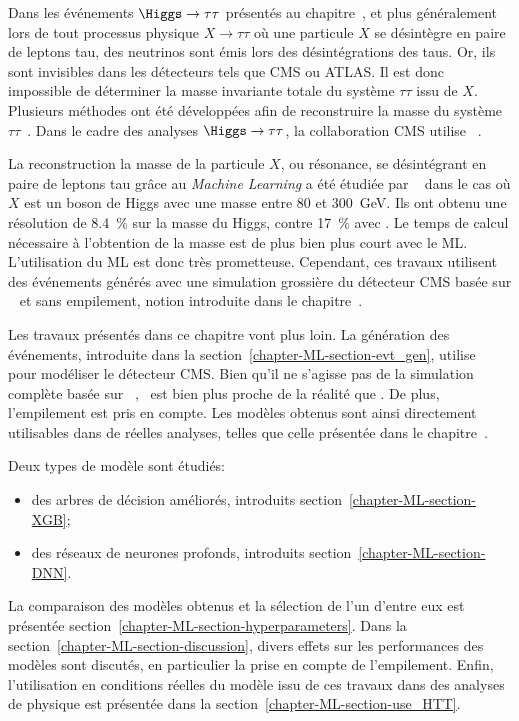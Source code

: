 \par
Dans les événements $\Higgs\to\tau\tau$ présentés au chapitre~,
et plus généralement lors de tout processus physique $X\to\tau\tau$ où une particule $X$ se désintègre en paire de leptons tau,
des neutrinos sont émis lors des désintégrations des taus.
Or, ils sont invisibles dans les détecteurs tels que CMS ou ATLAS.
Il est donc impossible de déterminer la masse invariante totale du système $\tau\tau$ issu de $X$.
Plusieurs méthodes ont été développées afin de reconstruire la masse du système $\tau\tau$~\cite{ELAGIN2011481,Barr_2011,Gripaios_2013}.
Dans le cadre des analyses $\Higgs\to\tau\tau$, la collaboration CMS utilise \SVFIT~\cite{SVFit_Bianchini_2014}.
\par
La reconstruction la masse de la particule $X$, ou résonance, se désintégrant en paire de leptons tau grâce au \emph{Machine Learning}
a été étudiée par \citeauthor{BARTSCHI201929}~\cite{BARTSCHI201929} dans le cas où $X$ est un boson de Higgs avec une masse entre \num{80} et \SI{300}{\GeV}.
Ils ont obtenu une résolution de \SI{8.4}{\%} sur la masse du Higgs, contre \SI{17}{\%} avec \SVFIT.
Le temps de calcul nécessaire à l'obtention de la masse est de plus bien plus court avec le ML.
L'utilisation du ML est donc très prometteuse.
Cependant,
ces travaux utilisent des événements générés
avec une simulation grossière du détecteur CMS basée sur
\DELPHES~\cite{Delphes,Delphes_additions}
et sans empilement, notion introduite dans le chapitre~.
\par
Les travaux présentés dans ce chapitre vont plus loin.
La génération des événements, introduite dans la section~\ref{chapter-ML-section-evt_gen},
utilise \FASTSIM~\cite{FastSim_2011,FastSim_2014,FastSim_2017_1,FastSim_2017_2}
pour modéliser le détecteur CMS.
Bien qu'il ne s'agisse pas de la simulation complète basée sur \GEANTfour~\cite{geant4_2003,geant4_2006,geant4_2016},
\FASTSIM\ est bien plus proche de la réalité que \DELPHES.
De plus, l'empilement est pris en compte.
Les modèles obtenus sont ainsi directement utilisables dans de réelles analyses, telles que celle présentée dans le chapitre~.
\par
Deux types de modèle sont étudiés:
\begin{itemize}
\item des arbres de décision améliorés, introduits section~\ref{chapter-ML-section-XGB};
\item des réseaux de neurones profonds, introduits section~\ref{chapter-ML-section-DNN}.
\end{itemize}
La comparaison des modèles obtenus et la sélection de l'un d'entre eux est présentée section~\ref{chapter-ML-section-hyperparameters}.
Dans la section~\ref{chapter-ML-section-discussion},
divers effets sur les performances des modèles sont discutés,
en particulier la prise en compte de l'empilement.
Enfin, l'utilisation en conditions réelles du modèle issu de ces travaux dans des analyses de physique est présentée dans la section~\ref{chapter-ML-section-use_HTT}.